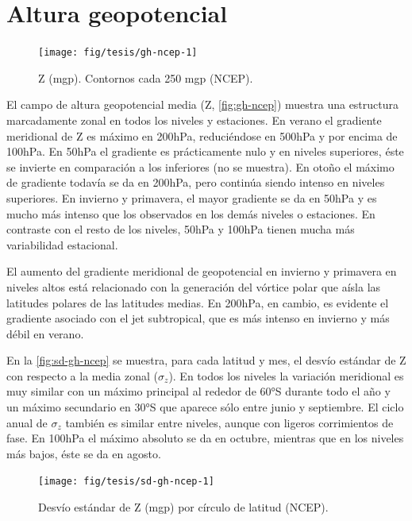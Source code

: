 \documentclass[spanish,a4paper,12pt,oneside]{book}
\begin{document}
\section{Altura geopotencial}\label{altura-geopotencial}

\begin{landscape}\begin{figure}

{\centering \texttt{[image: fig/tesis/gh-ncep-1]} 

}

\caption{Z (mgp). Contornos cada 250 mgp (NCEP).}\label{fig:gh-ncep}
\end{figure}
\end{landscape}

El campo de altura geopotencial media (Z, \autoref{fig:gh-ncep}) muestra
una estructura marcadamente zonal en todos los niveles y estaciones. En
verano el gradiente meridional de Z es máximo en 200hPa, reduciéndose en
500hPa y por encima de 100hPa. En 50hPa el gradiente es prácticamente
nulo y en niveles superiores, éste se invierte en comparación a los
inferiores (no se muestra). En otoño el máximo de gradiente todavía se
da en 200hPa, pero continúa siendo intenso en niveles superiores. En
invierno y primavera, el mayor gradiente se da en 50hPa y es mucho más
intenso que los observados en los demás niveles o estaciones. En
contraste con el resto de los niveles, 50hPa y 100hPa tienen mucha más
variabilidad estacional.

El aumento del gradiente meridional de geopotencial en invierno y
primavera en niveles altos está relacionado con la generación del
vórtice polar que aísla las latitudes polares de las latitudes medias.
En 200hPa, en cambio, es evidente el gradiente asociado con el jet
subtropical, que es más intenso en invierno y más débil en verano.

En la \autoref{fig:sd-gh-ncep} se muestra, para cada latitud y mes, el
desvío estándar de Z con respecto a la media zonal (\(\sigma_z\)). En
todos los niveles la variación meridional es muy similar con un máximo
principal al rededor de 60°S durante todo el año y un máximo secundario
en 30°S que aparece sólo entre junio y septiembre. El ciclo anual de
\(\sigma_z\) también es similar entre niveles, aunque con ligeros
corrimientos de fase. En 100hPa el máximo absoluto se da en octubre,
mientras que en los niveles más bajos, éste se da en agosto.

\begin{figure}
\texttt{[image: fig/tesis/sd-gh-ncep-1]} \caption{Desvío estándar de Z (mgp) por círculo de latitud (NCEP).}\label{fig:sd-gh-ncep}
\end{figure}
\end{document}
